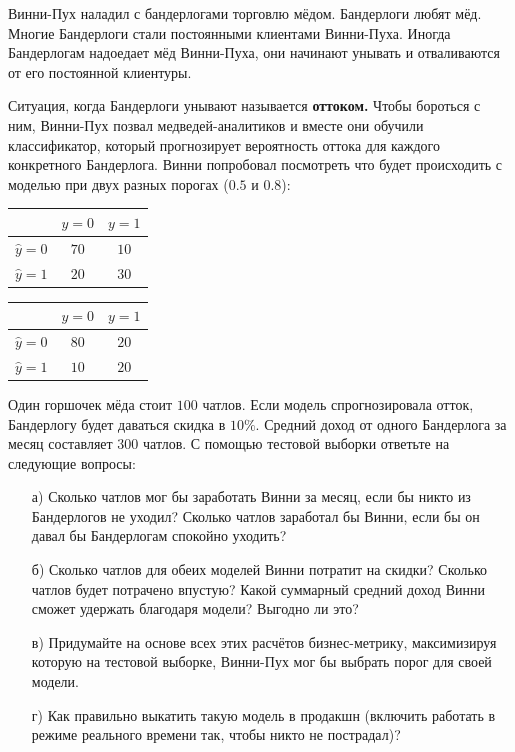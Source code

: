 \documentclass[12pt, a4paper, oneside]{article}
\theoremstyle{plain} %
\theoremstyle{definition}
\newcounter{problem}%
\renewcommand{\theproblem}{\arabic{problem}}
\newenvironment{problem}{
\addtocounter{problem}{1}\noindent{ \color{titleblue} \large \bfseries Упражнение~\theproblem \vspace{1ex} \newline}
}{ }
\newcommand{\indef}[1]{\textbf{ \color{green} #1}}
\begin{document}
\begin{problem} 
Винни-Пух наладил с бандерлогами торговлю мёдом. Бандерлоги любят мёд. Многие Бандерлоги стали постоянными клиентами Винни-Пуха. Иногда Бандерлогам надоедает мёд Винни-Пуха, они начинают унывать и отваливаются от его постоянной клиентуры. 

Ситуация, когда Бандерлоги унывают называется \indef{оттоком.} Чтобы бороться с ним, Винни-Пух позвал медведей-аналитиков и вместе они обучили классификатор, который прогнозирует вероятность оттока для каждого конкретного Бандерлога. Винни попробовал посмотреть что будет происходить с моделью при двух разных порогах ($0.5$ и $0.8$): 

\begin{center} 
\begin{minipage}[t]{0.45\textwidth}
	\begin{tabular}{|c|c|c|}
		\hline
		& $y=0$  &  $ y = 1$ \\  \hline 
		$\hat y = 0$  &   $70$ &    $10$ \\      \hline 
		$\hat y = 1$ &   $20$ &    $30$ \\      \hline
	\end{tabular}
\end{minipage}
\begin{minipage}[t]{0.45\textwidth}
	\begin{tabular}{|c|c|c|}
		\hline
		& $y=0$  &  $ y = 1$ \\  \hline 
		$\hat y = 0$  &   $80$ &    $20$ \\      \hline 
		$\hat y = 1$ &   $10$ &    $20$ \\      \hline
	\end{tabular}
\end{minipage}
\end{center} 

Один горшочек мёда стоит $100$ чатлов. Если модель спрогнозировала отток, Бандерлогу будет даваться скидка в $10\%$. Средний доход от одного Бандерлога за месяц составляет $300$ чатлов. С помощью тестовой выборки ответьте на следующие вопросы:  

\begin{enumerate} 
\item[а)] Сколько чатлов мог бы заработать Винни за месяц, если бы никто из Бандерлогов не уходил? Сколько чатлов заработал бы Винни, если бы он давал бы Бандерлогам спокойно уходить? 

\item[б)] Сколько чатлов для обеих моделей Винни потратит на скидки? Сколько чатлов будет потрачено впустую? Какой суммарный средний доход Винни сможет удержать благодаря модели? Выгодно ли это?  

\item[в)] Придумайте на основе всех этих расчётов бизнес-метрику, максимизируя которую на тестовой выборке, Винни-Пух мог бы выбрать порог для своей модели. 

\item[г)] Как правильно выкатить такую модель в продакшн (включить работать в режиме реального времени так, чтобы никто не пострадал)? 
\end{enumerate} 
\end{problem} 

\begin{solution}


\end{solution}
\end{document}
